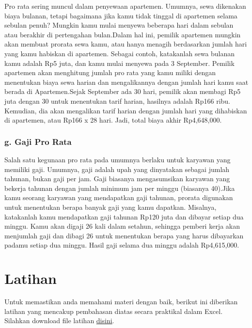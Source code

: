 \documentclass[
]{book}
\begin{document}
Pro rata sering muncul dalam penyewaan apartemen. Umumnya, sewa dikenakan biaya bulanan, tetapi bagaimana jika kamu tidak tinggal di apartemen selama sebulan penuh? Mungkin kamu mulai menyewa beberapa hari dalam sebulan atau berakhir di pertengahan bulan.Dalam hal ini, pemilik apartemen mungkin akan membuat prorata sewa kamu, atau hanya menagih berdasarkan jumlah hari yang kamu habiskan di apartemen. Sebagai contoh, katakanlah sewa bulanan kamu adalah Rp5 juta, dan kamu mulai menyewa pada 3 September. Pemilik apartemen akan menghitung jumlah pro rata yang kamu miliki dengan menentukan biaya sewa harian dan mengalikannya dengan jumlah hari kamu saat berada di Apartemen.Sejak September ada 30 hari, pemilik akan membagi Rp5 juta dengan 30 untuk menentukan tarif harian, hasilnya adalah Rp166 ribu. Kemudian, dia akan mengalikan tarif harian dengan jumlah hari yang dihabiskan di apartemen, atau Rp166 x 28 hari. Jadi, total biaya akhir Rp4,648,000.

\hypertarget{g.-gaji-pro-rata}{%
\subsubsection*{g. Gaji Pro Rata}\label{g.-gaji-pro-rata}}

Salah satu kegunaan pro rata pada umumnya berlaku untuk karyawan yang memiliki gaji. Umumnya, gaji adalah upah yang dinyatakan sebagai jumlah tahunan, bukan gaji per jam. Gaji biasanya mengasumsikan karyawan yang bekerja tahunan dengan jumlah minimum jam per minggu (biasanya 40).Jika kamu seorang karyawan yang mendapatkan gaji tahunan, prorata digunakan untuk menentukan berapa banyak gaji yang kamu dapatkan. Misalnya, katakanlah kamu mendapatkan gaji tahunan Rp120 juta dan dibayar setiap dua minggu. Kamu akan digaji 26 kali dalam setahun, sehingga pemberi kerja akan menjumlah gaji dan dibagi 26 untuk menentukan berapa yang harus dibayarkan padamu setiap dua minggu. Hasil gaji selama dua minggu adalah Rp4,615,000.

\hypertarget{latihan}{%
\section{Latihan}\label{latihan}}

Untuk memastikan anda memahami materi dengan baik, berikut ini diberikan latihan yang mencakup pembahasan diatas secara praktikal dalam Excel. Silahkan download file latihan \href{https://github.com/Bakti-Siregar/Matematika-Bisnis/blob/master/data/matematika-manajemen-bisnis.xlsx?raw=true}{disini}.

  
\end{document}
